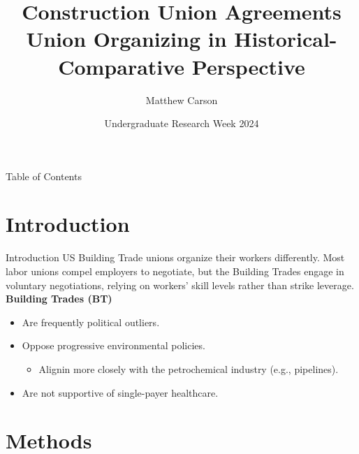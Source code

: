 \documentclass{beamer}
\title[Construction Union\ldots{Historical-Comparative}]{Construction Union Agreements\\
Union Organizing in Historical-Comparative Perspective}
\author{Matthew Carson}
\date[Undergrad. Research Week '24]{Undergraduate Research Week 2024}
\begin{document}
\begin{frame}
  \titlepage
\end{frame}

\begin{frame}{Table of Contents}
    \tableofcontents
\end{frame}

\section{Introduction}
\begin{frame}{Introduction}
	US Building Trade unions organize their workers differently. Most labor unions compel employers to negotiate, but the Building Trades engage in voluntary negotiations, relying on workers' skill levels rather than strike leverage. 
	\newline\newline
	\textbf{Building Trades (BT)}
	\begin{itemize}
		\item Are frequently political outliers.
		\item Oppose progressive environmental policies.
		\begin{itemize}
			\item Alignin more closely with the petrochemical industry (e.g., pipelines).
		\end{itemize}
		\item Are not supportive of single-payer healthcare.
	\end{itemize}
	
\end{frame}

\section{Methods}
\end{document}
